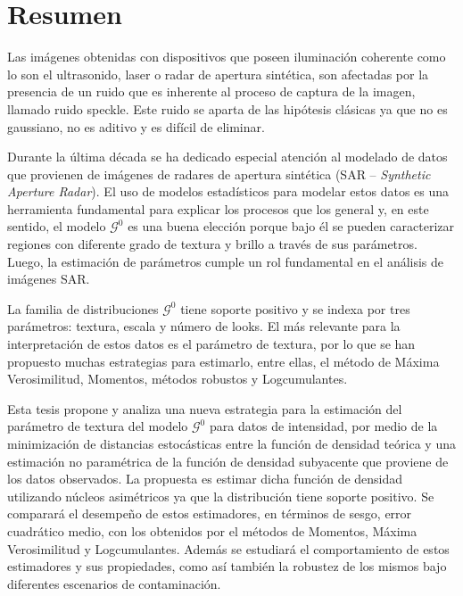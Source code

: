 \chapter{Resumen}

Las imágenes obtenidas con dispositivos que poseen iluminación coherente como lo son el ultrasonido, laser o radar de apertura sintética, son afectadas por la presencia de un ruido que es inherente al proceso de captura de la imagen, llamado ruido speckle. Este ruido se aparta de las hipótesis clásicas ya que no es gaussiano, no es aditivo y es difícil de eliminar. 

Durante la última década se ha dedicado especial atención al modelado de datos que provienen de imágenes de radares de apertura sintética (SAR -- \textit{Synthetic Aperture Radar}). 
El uso de modelos estadísticos para modelar estos datos es una herramienta fundamental para explicar los procesos que los general y, en este sentido, el modelo $\mathcal{G}^0$ es una buena elección porque bajo él se pueden caracterizar regiones con diferente grado de textura y brillo a través de sus parámetros. Luego, la estimación de parámetros cumple un rol fundamental en el análisis de imágenes SAR.  

La familia de distribuciones $\mathcal{G}^0$ tiene soporte positivo y se indexa por tres parámetros: textura, escala y número de looks. %
El más relevante para la interpretación de estos datos es el parámetro de textura, por lo que se han propuesto muchas estrategias para estimarlo, entre ellas, el método de Máxima Verosimilitud, Momentos, métodos robustos y Logcumulantes.

Esta tesis propone y analiza una nueva estrategia para la estimación del parámetro de textura del modelo $\mathcal G^0$ para datos de intensidad, por medio de la minimización de distancias estocásticas entre la función de densidad teórica y una estimación no paramétrica de la función de densidad subyacente que proviene de los datos observados. La propuesta es estimar dicha función de densidad utilizando núcleos asimétricos ya que la distribución tiene soporte positivo. Se comparará el desempeño de estos estimadores, en términos de sesgo, error cuadrático medio, con los obtenidos por el métodos de Momentos, Máxima Verosimilitud y Logcumulantes. Además se estudiará el comportamiento de estos estimadores y sus propiedades, como así también la robustez de los mismos bajo diferentes escenarios de contaminación.